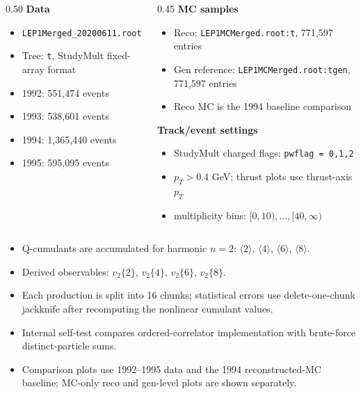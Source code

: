 \documentclass[aspectratio=169,10pt]{beamer}
\newcommand{\slidehead}[1]{%
  \begin{center}\vspace{-0.2em}{\Large\bfseries #1}\end{center}\vspace{0.3em}
}
\begin{document}
\begin{frame}
\slidehead{Samples and Selection}
\begin{columns}[T,totalwidth=0.96\textwidth]
\begin{column}{0.50\textwidth}
\textbf{Data}
\begin{itemize}\setlength\itemsep{0.35em}
  \item \texttt{LEP1Merged\_20200611.root}
  \item Tree: \texttt{t}, StudyMult fixed-array format
  \item 1992: 551,474 events
  \item 1993: 538,601 events
  \item 1994: 1,365,440 events
  \item 1995: 595,095 events
\end{itemize}
\end{column}
\begin{column}{0.45\textwidth}
\textbf{MC samples}
\begin{itemize}\setlength\itemsep{0.35em}
  \item Reco: \texttt{LEP1MCMerged.root:t}, 771,597 entries
  \item Gen reference: \texttt{LEP1MCMerged.root:tgen}, 771,597 entries
  \item Reco MC is the 1994 baseline comparison
\end{itemize}
\vspace{0.5em}
\textbf{Track/event settings}
\begin{itemize}\setlength\itemsep{0.35em}
  \item StudyMult charged flags: \texttt{pwflag = 0,1,2}
  \item \(p_T>0.4\) GeV; thrust plots use thrust-axis \(p_T\)
  \item multiplicity bins: \([0,10),\ldots,[40,\infty)\)
\end{itemize}
\end{column}
\end{columns}
\end{frame}

\begin{frame}
\slidehead{Analysis Workflow}
\begin{itemize}\setlength\itemsep{0.65em}
  \item Q-cumulants are accumulated for harmonic \(n=2\): \(\langle 2\rangle\), \(\langle 4\rangle\), \(\langle 6\rangle\), \(\langle 8\rangle\).
  \item Derived observables: \(v_2\{2\}\), \(v_2\{4\}\), \(v_2\{6\}\), \(v_2\{8\}\).
  \item Each production is split into 16 chunks; statistical errors use delete-one-chunk jackknife after recomputing the nonlinear cumulant values.
  \item Internal self-test compares ordered-correlator implementation with brute-force distinct-particle sums.
  \item Comparison plots use 1992--1995 data and the 1994 reconstructed-MC baseline; MC-only reco and gen-level plots are shown separately.
\end{itemize}
\end{frame}
\end{document}
